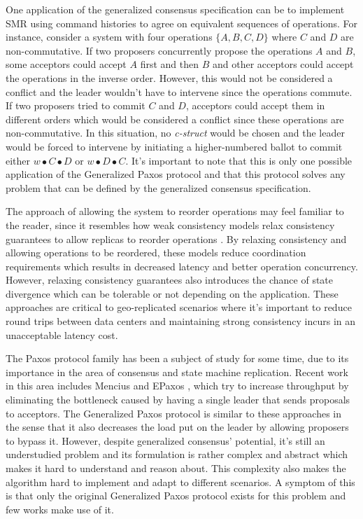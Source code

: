 One application of the generalized consensus specification can be to implement SMR using command histories to agree on equivalent sequences of operations. For instance, consider a system with four operations $\{A, B, C, D\}$ where $C$ and $D$ are non-commutative. If two proposers concurrently propose the operations $A$ and $B$, some acceptors could accept $A$ first and then $B$ and other acceptors could accept the operations in the inverse order. However, this would not be considered a conflict and the leader wouldn't have to intervene since the operations commute. If two proposers tried to commit $C$ and $D$, acceptors could accept them in different orders which would be considered a conflict since these operations are non-commutative. In this situation, no \textit{c-struct} would be chosen and the leader would be forced to intervene by initiating a higher-numbered ballot to commit either $w \bullet C \bullet D$ or $w \bullet D \bullet C$. It's important to note that this is only one possible application of the Generalized Paxos protocol and that this protocol solves any problem that can be defined by the generalized consensus specification. \par
The approach of allowing the system to reorder operations may feel familiar to the reader, since it resembles how weak consistency models relax consistency guarantees to allow replicas to reorder operations \cite{Ladin1992}. By relaxing consistency and allowing operations to be reordered, these models reduce coordination requirements which results in decreased latency and better operation concurrency. However, relaxing consistency guarantees also introduces the chance of state divergence which can be tolerable or not depending on the application. These approaches are critical to geo-replicated scenarios where it's important to reduce round trips between data centers and maintaining strong consistency incurs in an unacceptable latency cost. \par
The Paxos protocol family has been a subject of study for some time, due to its importance in the area of consensus and state machine replication. Recent work in this area includes Mencius \cite{Mao2008} and EPaxos \cite{Moraru2013}, which try to increase throughput by eliminating the bottleneck caused by having a single leader that sends proposals to acceptors. The Generalized Paxos protocol is similar to these approaches in the sense that it also decreases the load put on the leader by allowing proposers to bypass it. However, despite generalized consensus' potential, it's still an understudied problem and its formulation is rather complex and abstract which makes it hard to understand and reason about. This complexity also makes the algorithm hard to implement and adapt to different scenarios. A symptom of this is that only the original Generalized Paxos protocol exists for this problem and few works make use of it.  \par
